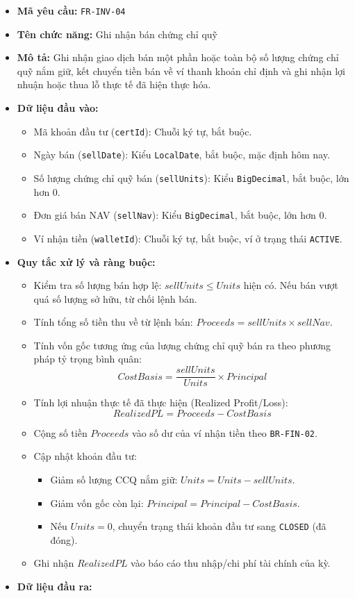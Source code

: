 \documentclass[11pt,a4paper]{article}
\providecommand{\tightlist}{
  \setlength{\itemsep}{0pt}\setlength{\parskip}{0pt}}
\begin{document}
\begin{itemize}
\tightlist
\item
  \textbf{Mã yêu cầu:} \texttt{FR-INV-04}
\item
  \textbf{Tên chức năng:} Ghi nhận bán chứng chỉ quỹ
\item
  \textbf{Mô tả:} Ghi nhận giao dịch bán một phần hoặc toàn bộ số lượng
  chứng chỉ quỹ nắm giữ, kết chuyển tiền bán về ví thanh khoản chỉ định
  và ghi nhận lợi nhuận hoặc thua lỗ thực tế đã hiện thực hóa.
\item
  \textbf{Dữ liệu đầu vào:}

  \begin{itemize}
  \tightlist
  \item
    Mã khoản đầu tư (\texttt{certId}): Chuỗi ký tự, bắt buộc.
  \item
    Ngày bán (\texttt{sellDate}): Kiểu \texttt{LocalDate}, bắt buộc, mặc
    định hôm nay.
  \item
    Số lượng chứng chỉ quỹ bán (\texttt{sellUnits}): Kiểu
    \texttt{BigDecimal}, bắt buộc, lớn hơn 0.
  \item
    Đơn giá bán NAV (\texttt{sellNav}): Kiểu \texttt{BigDecimal}, bắt
    buộc, lớn hơn 0.
  \item
    Ví nhận tiền (\texttt{walletId}): Chuỗi ký tự, bắt buộc, ví ở trạng
    thái \texttt{ACTIVE}.
  \end{itemize}
\item
  \textbf{Quy tắc xử lý và ràng buộc:}

  \begin{itemize}
  \tightlist
  \item
    Kiểm tra số lượng bán hợp lệ: \(sellUnits \le Units\) hiện có. Nếu
    bán vượt quá số lượng sở hữu, từ chối lệnh bán.
  \item
    Tính tổng số tiền thu về từ lệnh bán:
    \(Proceeds = sellUnits \times sellNav\).
  \item
    Tính vốn gốc tương ứng của lượng chứng chỉ quỹ bán ra theo phương
    pháp tỷ trọng bình quân:
    \[CostBasis = \frac{sellUnits}{Units} \times Principal\]
  \item
    Tính lợi nhuận thực tế đã thực hiện (Realized Profit/Loss):
    \[RealizedPL = Proceeds - CostBasis\]
  \item
    Cộng số tiền \(Proceeds\) vào số dư của ví nhận tiền theo
    \texttt{BR-FIN-02}.
  \item
    Cập nhật khoản đầu tư:

    \begin{itemize}
    \tightlist
    \item
      Giảm số lượng CCQ nắm giữ: \(Units = Units - sellUnits\).
    \item
      Giảm vốn gốc còn lại: \(Principal = Principal - CostBasis\).
    \item
      Nếu \(Units = 0\), chuyển trạng thái khoản đầu tư sang
      \texttt{CLOSED} (đã đóng).
    \end{itemize}
  \item
    Ghi nhận \(RealizedPL\) vào báo cáo thu nhập/chi phí tài chính của
    kỳ.
  \end{itemize}
\item
  \textbf{Dữ liệu đầu ra:}


\end{itemize}
\end{document}
